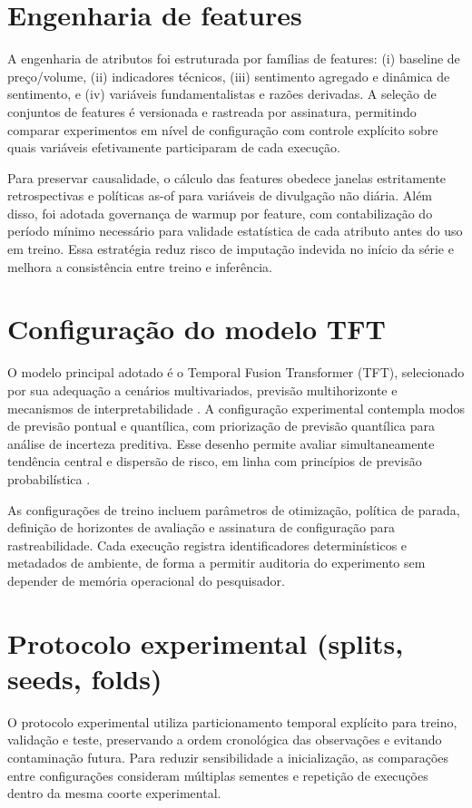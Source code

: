 \section{Engenharia de features}
A engenharia de atributos foi estruturada por famílias de features: (i) baseline de preço/volume, (ii) indicadores técnicos, (iii) sentimento agregado e dinâmica de sentimento, e (iv) variáveis fundamentalistas e razões derivadas. A seleção de conjuntos de features é versionada e rastreada por assinatura, permitindo comparar experimentos em nível de configuração com controle explícito sobre quais variáveis efetivamente participaram de cada execução.

Para preservar causalidade, o cálculo das features obedece janelas estritamente retrospectivas e políticas as-of para variáveis de divulgação não diária. Além disso, foi adotada governança de warmup por feature, com contabilização do período mínimo necessário para validade estatística de cada atributo antes do uso em treino. Essa estratégia reduz risco de imputação indevida no início da série e melhora a consistência entre treino e inferência.

\section{Configuração do modelo TFT}
O modelo principal adotado é o Temporal Fusion Transformer (TFT), selecionado por sua adequação a cenários multivariados, previsão multihorizonte e mecanismos de interpretabilidade \cite{LIMETAL2021TFT}. A configuração experimental contempla modos de previsão pontual e quantílica, com priorização de previsão quantílica para análise de incerteza preditiva. Esse desenho permite avaliar simultaneamente tendência central e dispersão de risco, em linha com princípios de previsão probabilística \cite{GNEITING2007,KOENKERBASSETT1978}.

As configurações de treino incluem parâmetros de otimização, política de parada, definição de horizontes de avaliação e assinatura de configuração para rastreabilidade. Cada execução registra identificadores determinísticos e metadados de ambiente, de forma a permitir auditoria do experimento sem depender de memória operacional do pesquisador.

\section{Protocolo experimental (splits, seeds, folds)}
O protocolo experimental utiliza particionamento temporal explícito para treino, validação e teste, preservando a ordem cronológica das observações e evitando contaminação futura. Para reduzir sensibilidade a inicialização, as comparações entre configurações consideram múltiplas sementes e repetição de execuções dentro da mesma coorte experimental.


